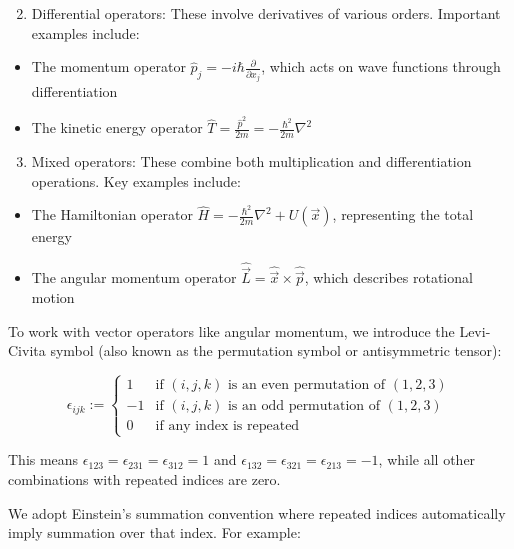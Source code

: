 \documentclass[10pt]{article}
\begin{document}
\begin{enumerate}
  \setcounter{enumi}{1}
  \item Differential operators: These involve derivatives of various orders. Important examples include:
\end{enumerate}

\begin{itemize}
  \item The momentum operator $\hat{p}_{j}=-i \hbar \frac{\partial}{\partial x_{j}}$, which acts on wave functions through differentiation
  \item The kinetic energy operator $\hat{T} = \frac{\hat{p}^2}{2m} = -\frac{\hbar^2}{2m}\nabla^2$
\end{itemize}


\begin{enumerate}
  \setcounter{enumi}{2}
  \item Mixed operators: These combine both multiplication and differentiation operations. Key examples include:
\end{enumerate}

\begin{itemize}
  \item The Hamiltonian operator $\hat{H}=-\frac{\hbar^{2}}{2 m} \nabla^{2}+U(\vec{x})$, representing the total energy
  \item The angular momentum operator $\hat{\vec{L}}=\hat{\vec{x}} \times \hat{\vec{p}}$, which describes rotational motion
\end{itemize}

To work with vector operators like angular momentum, we introduce the Levi-Civita symbol (also known as the permutation symbol or antisymmetric tensor):

\[
\epsilon_{i j k}:= \begin{cases}
1 & \text{if $(i,j,k)$ is an even permutation of $(1,2,3)$} \tag{1.43}\\
-1 & \text{if $(i,j,k)$ is an odd permutation of $(1,2,3)$} \\
0 & \text{if any index is repeated}
\end{cases}
\]

This means $\epsilon_{123} = \epsilon_{231} = \epsilon_{312} = 1$ and $\epsilon_{132} = \epsilon_{321} = \epsilon_{213} = -1$, while all other combinations with repeated indices are zero.

We adopt Einstein's summation convention where repeated indices automatically imply summation over that index. For example:
\end{document}

